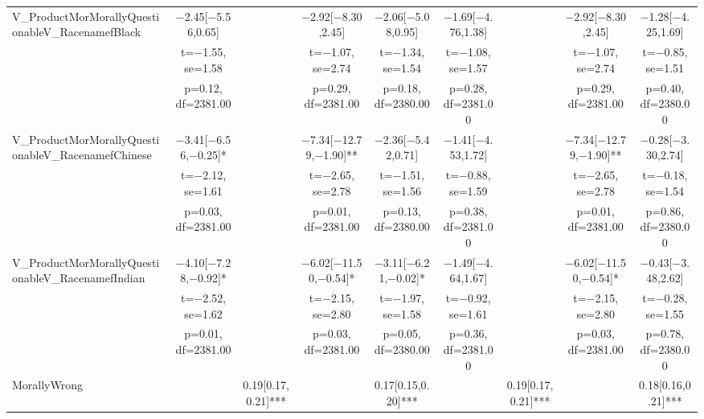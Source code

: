 \documentclass[]{report}
\begin{document}
\begin{table}
{\begin{tabular}[t]{lcccccccc}
			V\_ProductMorMorallyQuestionableV\_RacenamefBlack & \num{-2.45}[\num{-5.56},\num{0.65}] &  & \num{-2.92}[\num{-8.30},\num{2.45}] & \num{-2.06}[\num{-5.08},\num{0.95}] & \num{-1.69}[\num{-4.76},\num{1.38}] &  & \num{-2.92}[\num{-8.30},\num{2.45}] & \num{-1.28}[\num{-4.25},\num{1.69}]\\
			& t=\num{-1.55}, se=\num{1.58} &  & t=\num{-1.07}, se=\num{2.74} & t=\num{-1.34}, se=\num{1.54} & t=\num{-1.08}, se=\num{1.57} &  & t=\num{-1.07}, se=\num{2.74} & t=\num{-0.85}, se=\num{1.51}\\
			& p=\num{0.12}, df=\num{2381.00} &  & p=\num{0.29}, df=\num{2381.00} & p=\num{0.18}, df=\num{2380.00} & p=\num{0.28}, df=\num{2381.00} &  & p=\num{0.29}, df=\num{2381.00} & p=\num{0.40}, df=\num{2380.00}\\
			V\_ProductMorMorallyQuestionableV\_RacenamefChinese & \num{-3.41}[\num{-6.56},\num{-0.25}]* &  & \num{-7.34}[\num{-12.79},\num{-1.90}]** & \num{-2.36}[\num{-5.42},\num{0.71}] & \num{-1.41}[\num{-4.53},\num{1.72}] &  & \num{-7.34}[\num{-12.79},\num{-1.90}]** & \num{-0.28}[\num{-3.30},\num{2.74}]\\
			& t=\num{-2.12}, se=\num{1.61} &  & t=\num{-2.65}, se=\num{2.78} & t=\num{-1.51}, se=\num{1.56} & t=\num{-0.88}, se=\num{1.59} &  & t=\num{-2.65}, se=\num{2.78} & t=\num{-0.18}, se=\num{1.54}\\
			& p=\num{0.03}, df=\num{2381.00} &  & p=\num{0.01}, df=\num{2381.00} & p=\num{0.13}, df=\num{2380.00} & p=\num{0.38}, df=\num{2381.00} &  & p=\num{0.01}, df=\num{2381.00} & p=\num{0.86}, df=\num{2380.00}\\
			V\_ProductMorMorallyQuestionableV\_RacenamefIndian & \num{-4.10}[\num{-7.28},\num{-0.92}]* &  & \num{-6.02}[\num{-11.50},\num{-0.54}]* & \num{-3.11}[\num{-6.21},\num{-0.02}]* & \num{-1.49}[\num{-4.64},\num{1.67}] &  & \num{-6.02}[\num{-11.50},\num{-0.54}]* & \num{-0.43}[\num{-3.48},\num{2.62}]\\
			& t=\num{-2.52}, se=\num{1.62} &  & t=\num{-2.15}, se=\num{2.80} & t=\num{-1.97}, se=\num{1.58} & t=\num{-0.92}, se=\num{1.61} &  & t=\num{-2.15}, se=\num{2.80} & t=\num{-0.28}, se=\num{1.55}\\
			& p=\num{0.01}, df=\num{2381.00} &  & p=\num{0.03}, df=\num{2381.00} & p=\num{0.05}, df=\num{2380.00} & p=\num{0.36}, df=\num{2381.00} &  & p=\num{0.03}, df=\num{2381.00} & p=\num{0.78}, df=\num{2380.00}\\
			MorallyWrong &  & \num{0.19}[\num{0.17},\num{0.21}]*** &  & \num{0.17}[\num{0.15},\num{0.20}]*** &  & \num{0.19}[\num{0.17},\num{0.21}]*** &  & \num{0.18}[\num{0.16},\num{0.21}]***\\

\end{tabular}}
\end{table}
\end{document}

